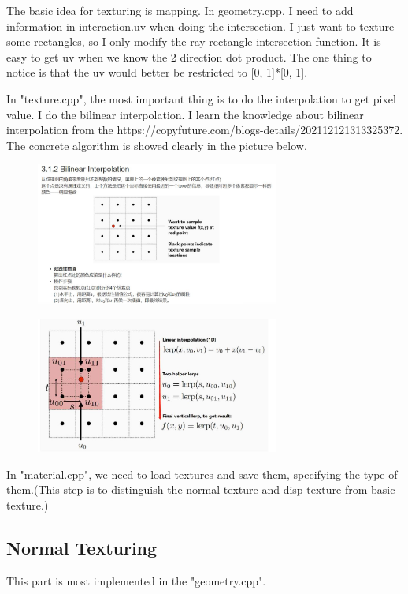 \documentclass[acmtog]{acmart}
\begin{document}
The basic idea for texturing is mapping. In geometry.cpp, I need to add information in interaction.uv when doing the intersection. 
I just want to texture some rectangles, so I only modify the ray-rectangle intersection function. It is easy to get uv when we know the 2 direction dot product. 
The one thing to notice is that the uv would better be restricted to [0, 1]*[0, 1].


In "texture.cpp", the most important thing is to do the interpolation to get pixel value. I do the bilinear interpolation. 
I learn the knowledge about bilinear interpolation from the https://copyfuture.com/blogs-details/202112121313325372. 
The concrete algorithm is showed clearly in the picture below. 
\begin{figure}[h]
	\centering
	{\includegraphics[width=8cm]{b1.JPG}}	
\end{figure}

\begin{figure}[h]
	\centering
	{\includegraphics[width=8cm]{b2.JPG}}	
\end{figure}

In "material.cpp", we need to load textures and save them, specifying the type of them.(This step is to distinguish the normal texture and disp texture from basic texture.)


\subsection{Normal Texturing}
\quad This part is most implemented in the "geometry.cpp". 
\end{document}
